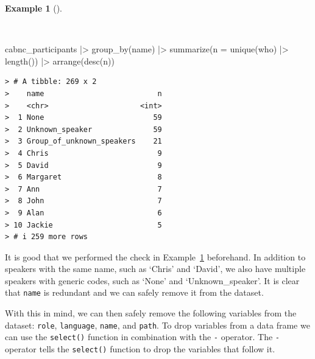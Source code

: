 \documentclass[
  letterpaper,
  DIV=11,
  numbers=noendperiod]{scrreprt}
\newenvironment{Shaded}{\begin{snugshade}}{\end{snugshade}}
\newcommand{\AttributeTok}[1]{\textcolor[rgb]{0.00,0.00,0.00}{#1}}
\newcommand{\FunctionTok}[1]{\textcolor[rgb]{0.00,0.00,0.00}{#1}}
\newcommand{\NormalTok}[1]{\textcolor[rgb]{0.00,0.00,0.00}{#1}}
\newcommand{\SpecialCharTok}[1]{\textcolor[rgb]{0.00,0.00,0.00}{#1}}
\theoremstyle{definition}
\newtheorem{example}{Example}[chapter]
\theoremstyle{remark}
\begin{document}
\begin{example}[]\protect\hypertarget{exm-cd-cabnc-who-name}{}\label{exm-cd-cabnc-who-name}

~

\begin{Shaded}
\begin{Highlighting}[]
\NormalTok{cabnc\_participants }\SpecialCharTok{|\textgreater{}}
  \FunctionTok{group\_by}\NormalTok{(name) }\SpecialCharTok{|\textgreater{}}
  \FunctionTok{summarize}\NormalTok{(}\AttributeTok{n =} \FunctionTok{unique}\NormalTok{(who) }\SpecialCharTok{|\textgreater{}} \FunctionTok{length}\NormalTok{()) }\SpecialCharTok{|\textgreater{}}
  \FunctionTok{arrange}\NormalTok{(}\FunctionTok{desc}\NormalTok{(n))}
\end{Highlighting}
\end{Shaded}

\begin{verbatim}
> # A tibble: 269 x 2
>    name                          n
>    <chr>                     <int>
>  1 None                         59
>  2 Unknown_speaker              59
>  3 Group_of_unknown_speakers    21
>  4 Chris                         9
>  5 David                         9
>  6 Margaret                      8
>  7 Ann                           7
>  8 John                          7
>  9 Alan                          6
> 10 Jackie                        5
> # i 259 more rows
\end{verbatim}

\end{example}

It is good that we performed the check in
Example~\ref{exm-cd-cabnc-who-name} beforehand. In addition to speakers
with the same name, such as `Chris' and `David', we also have multiple
speakers with generic codes, such as `None' and `Unknown\_speaker'. It
is clear that \texttt{name} is redundant and we can safely remove it
from the dataset.

With this in mind, we can then safely remove the following variables
from the dataset: \texttt{role}, \texttt{language}, \texttt{name}, and
\texttt{path}. To drop variables from a data frame we can use the
\texttt{select()} function in combination with the \texttt{-} operator.
The \texttt{-} operator tells the \texttt{select()} function to drop the
variables that follow it.
\end{document}
